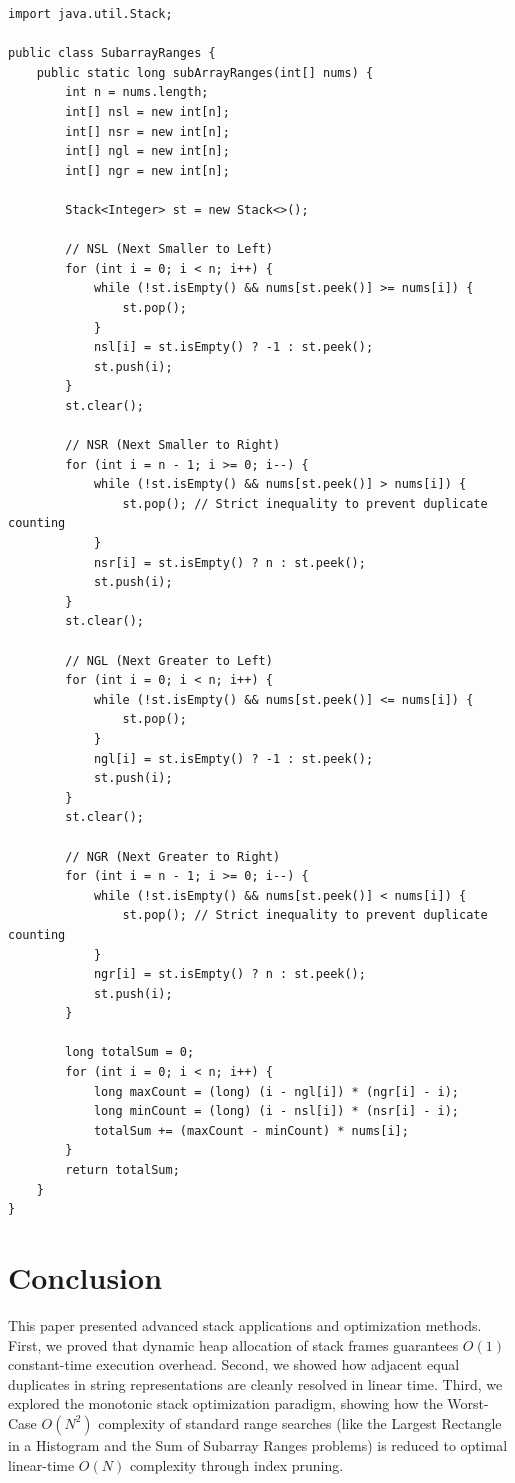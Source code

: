 \documentclass[10pt,journal,compsoc,onecolumn]{IEEEtran}
\begin{document}
\begin{verbatim}
import java.util.Stack;

public class SubarrayRanges {
    public static long subArrayRanges(int[] nums) {
        int n = nums.length;
        int[] nsl = new int[n];
        int[] nsr = new int[n];
        int[] ngl = new int[n];
        int[] ngr = new int[n];

        Stack<Integer> st = new Stack<>();

        // NSL (Next Smaller to Left)
        for (int i = 0; i < n; i++) {
            while (!st.isEmpty() && nums[st.peek()] >= nums[i]) {
                st.pop();
            }
            nsl[i] = st.isEmpty() ? -1 : st.peek();
            st.push(i);
        }
        st.clear();

        // NSR (Next Smaller to Right)
        for (int i = n - 1; i >= 0; i--) {
            while (!st.isEmpty() && nums[st.peek()] > nums[i]) {
                st.pop(); // Strict inequality to prevent duplicate counting
            }
            nsr[i] = st.isEmpty() ? n : st.peek();
            st.push(i);
        }
        st.clear();

        // NGL (Next Greater to Left)
        for (int i = 0; i < n; i++) {
            while (!st.isEmpty() && nums[st.peek()] <= nums[i]) {
                st.pop();
            }
            ngl[i] = st.isEmpty() ? -1 : st.peek();
            st.push(i);
        }
        st.clear();

        // NGR (Next Greater to Right)
        for (int i = n - 1; i >= 0; i--) {
            while (!st.isEmpty() && nums[st.peek()] < nums[i]) {
                st.pop(); // Strict inequality to prevent duplicate counting
            }
            ngr[i] = st.isEmpty() ? n : st.peek();
            st.push(i);
        }

        long totalSum = 0;
        for (int i = 0; i < n; i++) {
            long maxCount = (long) (i - ngl[i]) * (ngr[i] - i);
            long minCount = (long) (i - nsl[i]) * (nsr[i] - i);
            totalSum += (maxCount - minCount) * nums[i];
        }
        return totalSum;
    }
}
\end{verbatim}

\section{Conclusion}
This paper presented advanced stack applications and optimization methods. First, we proved that dynamic heap allocation of stack frames guarantees $O(1)$ constant-time execution overhead. Second, we showed how adjacent equal duplicates in string representations are cleanly resolved in linear time. Third, we explored the monotonic stack optimization paradigm, showing how the Worst-Case $O(N^2)$ complexity of standard range searches (like the Largest Rectangle in a Histogram and the Sum of Subarray Ranges problems) is reduced to optimal linear-time $O(N)$ complexity through index pruning.
\end{document}
